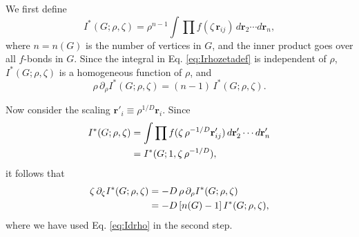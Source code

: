 \documentclass[preprint]{revtex4-1}
\newcommand{\vct}[1]{\mathbf{#1}}
\providecommand{\vr}{} %
\renewcommand{\vr}{\vct{r}}
\begin{document}
We first define
\begin{equation}
  I^*(G; \rho, \zeta)
  = \rho^{n-1} \int \prod f(\zeta \, \vr_{ij}) \, d\vr_2 \cdots d\vr_n,
  \label{eq:Irhozetadef}
\end{equation}
where $n = n(G)$ is the number of vertices in $G$,
and the inner product goes over all $f$-bonds in $G$.
Since the integral in Eq. \eqref{eq:Irhozetadef} is independent of $\rho$,
$I^*(G;\rho, \zeta)$ is a homogeneous function of $\rho$, and
%
\begin{equation}
  \rho \, \partial_\rho I^*(G; \rho, \zeta)
  = (n - 1) \, I^*(G; \rho, \zeta).
  \label{eq:Idrho}
\end{equation}



Now consider the scaling
$\vr'_i \equiv \rho^{1/D} \vr_i$.
Since
\begin{align*}
  I^*(G; \rho, \zeta)
&= \int \prod f(\zeta \, \rho^{-1/D} \vr'_{ij})
        \, d\vr'_2 \cdots d\vr'_n
  \notag \\
&= I^*(G; 1, \zeta \, \rho^{-1/D}),
\end{align*}
%
it follows that
\begin{align}
 \zeta \, \partial_\zeta I^*(G; \rho, \zeta)
&= -D \, \rho \, \partial_\rho I^*(G; \rho, \zeta) \notag \\
&= -D \, [n(G) - 1] \, I^*(G; \rho, \zeta),
\label{eq:drhodzeta}
\end{align}
where we have used Eq. \eqref{eq:Idrho} in the second step.
\end{document}
